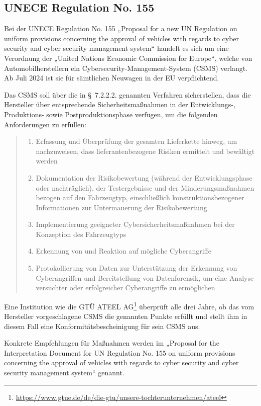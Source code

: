 \subsection{UNECE Regulation No. 155}\label{subsec:unce}
Bei der UNECE Regulation No. 155 „Proposal for a new UN Regulation on uniform provisions concerning the approval of vehicles with regards to cyber security and cyber security management system“ handelt es sich um eine Verordnung der „United Nations Economic Commission for Europe“, welche von Automobilherstellern ein Cybersecurity-Management-System (CSMS) verlangt. Ab Juli 2024 ist sie für sämtlichen Neuwagen in der EU verpflichtend.  

Das CSMS soll über die in § 7.2.2.2. genannten Verfahren sicherstellen, dass die Hersteller über entsprechende Sicherheitsmaßnahmen in der Entwicklungs-, Produktions- sowie Postproduktionsphase verfügen, um die folgenden Anforderungen zu erfüllen:
 \begin{quote}
\begin{enumerate}[label=\alph*.]
  \item Erfassung und Überprüfung der gesamten Lieferkette hinweg, um nachzuweisen, dass lieferantenbezogene Risiken ermittelt und bewältigt werden
  \item Dokumentation der Risikobewertung (während der Entwicklungsphase oder nachträglich), der Testergebnisse und der Minderungsmaßnahmen bezogen auf den Fahrzeugtyp, einschließlich konstruktionsbezogener Informationen zur Untermauerung der Risikobewertung
  \item Implementierung geeigneter Cybersicherheitsmaßnahmen bei der Konzeption des Fahrzeugtyps
  \item Erkennung von und Reaktion auf mögliche Cyberangriffe
  \item Protokollierung von Daten zur Unterstützung der Erkennung von Cyberangriffen und Bereitstellung von Datenforensik, um eine Analyse versuchter oder erfolgreicher Cyberangriffe zu ermöglichen
\end{enumerate}
\cite[§ 7.2.2.2.]{un115}
\end{quote}

Eine Institution wie die GTÜ ATEEL AG\footnote{\url{https://www.gtue.de/de/die-gtu/unsere-tochterunternehmen/ateel}} überprüft alle drei Jahre, ob das vom Hersteller vorgeschlagene CSMS die genannten Punkte erfüllt und stellt ihm in diesem Fall eine Konformitätsbescheinigung für sein CSMS aus.

Konkrete Empfehlungen für Maßnahmen werden im „Proposal for the Interpretation Document for UN Regulation No. 155 on uniform provisions concerning the  approval of vehicles with regards to cyber security and cyber security management system“ genannt.

